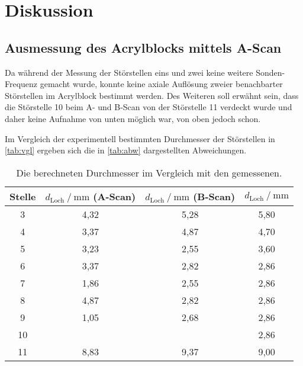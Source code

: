 \section{Diskussion}
\label{sec:Diskussion}

\subsection{Ausmessung des Acrylblocks mittels A-Scan}

Da während der Messung der Störstellen eins und zwei keine weitere Sonden-Frequenz gemacht wurde, 
konnte keine axiale Auflösung zweier benachbarter Störstellen im Acrylblock bestimmt werden.
Des Weiteren soll erwähnt sein, dass die Störstelle 10 beim A- und B-Scan von der Störstelle 11 verdeckt wurde und daher keine Aufnahme von unten möglich war, 
von oben jedoch schon.

Im Vergleich der experimentell bestimmten Durchmesser der Störstellen in \autoref{tab:vgl} ergeben sich die in \autoref{tab:abw} dargestellten Abweichungen.
\begin{table}[H]
    \centering
    \caption{Die berechneten Durchmesser im Vergleich mit den gemessenen.}
    \label{tab:vgl}
    \begin{tabular}{c c c c}
        \toprule
        Stelle &
        $d_\text{Loch} \mathbin{/} \unit{\milli\meter}$ (A-Scan) &
        $d_\text{Loch} \mathbin{/} \unit{\milli\meter}$ (B-Scan) & 
        $d_\text{Loch} \mathbin{/} \unit{\milli\meter}$ \\
        \midrule
                3 &             4,32 &             5,28 &           5,80 \\
                4 &             3,37 &             4,87 &           4,70 \\
                5 &             3,23 &             2,55 &           3,60 \\
                6 &             3,37 &             2,82 &           2,86 \\
                7 &             1,86 &             2,55 &           2,86 \\
                8 &             4,87 &             2,82 &           2,86 \\
                9 &             1,05 &             2,68 &           2,86 \\
                10 &                  &                  &           2,86 \\
                11 &             8,83 &             9,37 &           9,00 \\
        \bottomrule
    \end{tabular}
\end{table}

